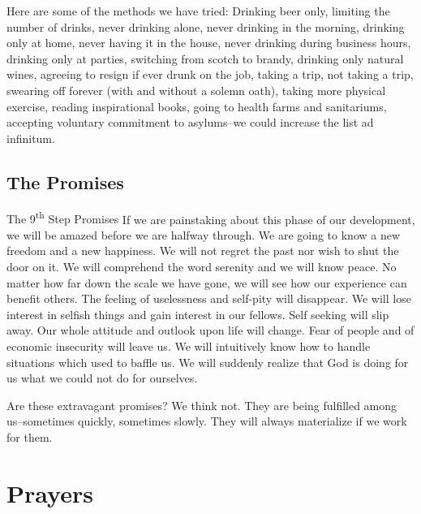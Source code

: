 \documentclass{beamer}
\begin{document}
\begin{frame}
Here are some of the methods we have tried: Drinking  beer  only,  limiting  the  number  of  drinks,  never drinking  alone,  never  drinking  in  the  morning,  drinking  only  at  home,  never  having  it  in  the  house,  never drinking  during  business  hours,  drinking  only  at parties,  switching  from  scotch  to  brandy,  drinking only natural wines, agreeing to resign if ever drunk on the  job,  taking  a  trip,  not  taking  a  trip,  swearing  off forever (with and without a solemn oath), taking more physical  exercise,  reading  inspirational  books,  going to health  farms  and  sanitariums,  accepting  voluntary commitment  to  asylums--we  could  increase  the  list ad infinitum.
\end{frame}

 \subsection{The Promises}
 \begin{frame}[plain]
       \begin{exampleblock}{The 9\textsuperscript{th} Step Promises %
       }
 If we are painstaking about this phase of our
development, we will be amazed before we are
halfway through. We are going to know a new
freedom and a new happiness. We will not
regret the past nor wish to shut the door on it.
We will comprehend the word serenity and we
will know peace. No matter how far down the
scale we have gone, we will see how our
experience can benefit others. The feeling of
uselessness and self-pity will disappear. We will
lose interest in selfish things and gain interest in
our fellows. Self seeking will slip away. Our
whole attitude and outlook upon life will change.
Fear of people and of economic insecurity will
leave us. We will intuitively know how to handle
situations which used to baffle us. We will
suddenly realize that God is doing for us what
we could not do for ourselves.
\bigskip

Are these extravagant promises? We think not.
They are being fulfilled among us--sometimes
quickly, sometimes slowly. They will always
materialize if we work for them.
	\end{exampleblock}
\end{frame}
   
 
    \section{Prayers}
\end{document}
